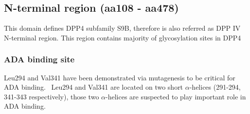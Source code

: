 \subsection{N-terminal region (aa108 - aa478)}

This domain defines DPP4 subfamily S9B, therefore is also referred as DPP IV N-terminal region. This region contains majority of  glycosylation sites in DPP4

\subsubsection{ADA binding site}
Leu294 and Val341 have been demonstrated via mutagenesis to be critical for ADA binding.~\cite{Abbott_1999} Leu294 and Val341 are located on two short $\alpha$-helices (291-294, 341-343 respectively), those two $\alpha$-helices are suspected to play important role in ADA binding. 